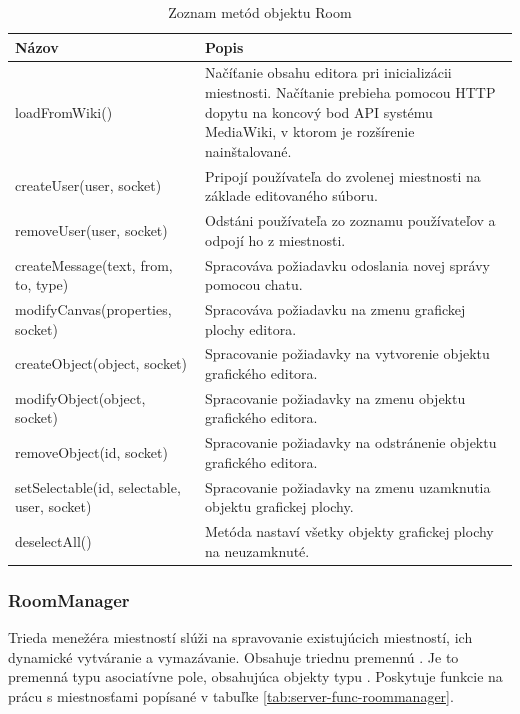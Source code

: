 \begin{table}
	\begin{tabular}{ | m{6cm} | m{6.5cm} | } \hline
		\textbf{Názov} & \textbf{Popis} \\ \hline \hline
		
		loadFromWiki() & Načíťanie obsahu editora pri inicializácii miestnosti. Načítanie prebieha pomocou HTTP dopytu na koncový bod API systému MediaWiki, v ktorom je rozšírenie nainštalované. \\\hline
		createUser(user, socket) & Pripojí používateľa do zvolenej miestnosti na základe editovaného súboru. \\\hline
		removeUser(user, socket) & Odstáni používateľa zo zoznamu používateľov a odpojí ho z miestnosti.  \\\hline
		createMessage(text, from, to, type) & Spracováva požiadavku odoslania novej správy pomocou chatu. \\\hline
		modifyCanvas(properties, socket) & Spracováva požiadavku na zmenu grafickej plochy editora. \\\hline
		createObject(object, socket) & Spracovanie požiadavky na vytvorenie objektu grafického editora. \\\hline
		modifyObject(object, socket) & Spracovanie požiadavky na zmenu objektu grafického editora. \\\hline
		removeObject(id, socket) & Spracovanie požiadavky na odstránenie objektu grafického editora. \\\hline
		setSelectable(id, selectable, user, socket) & Spracovanie požiadavky na zmenu uzamknutia objektu grafickej plochy. \\\hline
		deselectAll() & Metóda nastaví všetky objekty grafickej plochy na neuzamknuté. \\\hline
		
		\hline
	\end{tabular}
	\caption{Zoznam metód objektu Room}
	\label{tab:server-func-room}
\end{table}


\subsubsection{RoomManager}
Trieda menežéra miestností  slúži na spravovanie existujúcich miestností, ich dynamické vytváranie a vymazávanie. Obsahuje triednu premennú . Je to premenná typu asociatívne pole, obsahujúca objekty typu . Poskytuje funkcie na prácu s miestnosťami popísané v tabuľke \ref{tab:server-func-roommanager}.

